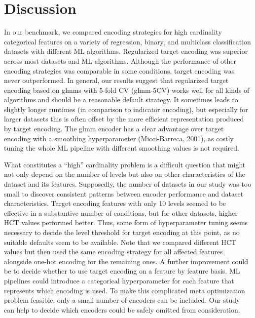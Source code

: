 \documentclass[smallextended]{svjour3}       %
\begin{document}
\hypertarget{discussion}{%
\section{Discussion}\label{discussion}}

In our benchmark, we compared encoding strategies for high cardinality categorical features on a variety of regression, binary, and multiclass classification datasets with different ML algorithms.
Regularized target encoding was superior across most datasets and ML algorithms.
Although the performance of other encoding strategies was comparable in some conditions, target encoding was never outperformed.
In general, our results suggest that regularized target encoding based on glmms with 5-fold CV (glmm-5CV) works well for all kinds of algorithms and should be a reasonable default strategy.
It sometimes leads to slightly longer runtimes (in comparison to indicator encoding), but especially for larger datasets this is often offset by the more efficient representation produced by target encoding.
The glmm encoder has a clear advantage over target encoding with a smoothing hyperparameter (Micci-Barreca, 2001), as costly tuning the whole ML pipeline with different smoothing values is not required.

What constitutes a ``high'' cardinality problem is a difficult question that might not only depend on the number of levels but also on other characteristics of the dataset and its features.
Supposedly, the number of datasets in our study was too small to discover consistent patterns between encoder performance and dataset characteristics.
Target encoding features with only 10 levels seemed to be effective in a substantive number of conditions, but for other datasets, higher HCT values performed better.
Thus, some form of hyperparameter tuning seems necessary to decide the level threshold for target encoding at this point, as no suitable defaults seem to be available.
Note that we compared different HCT values but then used the same encoding strategy for all affected features alongside one-hot encoding for the remaining ones.
A further improvement could be to decide whether to use target encoding on a feature by feature basis.
ML pipelines could introduce a categorical hyperparameter for each feature that represents which encoding is used.
To make this complicated meta optimization problem feasible, only a small number of encoders can be included.
Our study can help to decide which encoders could be safely omitted from consideration.
\end{document}
